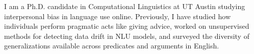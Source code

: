 I am a Ph.D. candidate in Computational Linguistics at UT Austin studying interpersonal bias in language use online. Previously, I have studied how individuals perform pragmatic acts like giving advice, worked on unsupervised methods for detecting data drift in NLU models, and surveyed the diversity of generalizations available across predicates and arguments in English.
